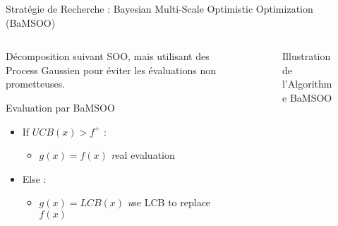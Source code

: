 \begin{frame}{Stratégie de Recherche : Bayesian Multi-Scale Optimistic Optimization (BaMSOO)}
    \begin{columns}
        
        \begin{column}[t]{0.45\textwidth} 
            \vspace*{10pt}

            Décomposition suivant SOO, mais utilisant des Process Gaussien pour éviter les évaluations non prometteuses. 
            \begin{block}{Evaluation par BaMSOO}
                \begin{itemize}
                    \item If $UCB(x) > f^+$ :
                    \begin{itemize}
                        \item $g(x) = f(x)$ {\small \textit real evaluation}
                    \end{itemize}
                    \item Else : 
                    \begin{itemize}
                        \item $g(x) = LCB(x)$ {\small \textit use LCB to replace $f(x)$}
                    \end{itemize}
                \end{itemize}
                
            \end{block}
     
            \end{column}
                 
            \begin{column}[t]{0.45\textwidth}
                \begin{figure}
                    \centering
                    
                    \caption{Illustration de l'Algorithme BaMSOO}
                \end{figure} 
            \end{column}
                 
    \end{columns}
\end{frame}

